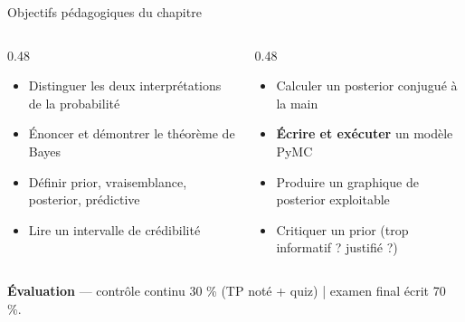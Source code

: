 \begin{frame}{Objectifs pédagogiques du chapitre}
\begin{columns}[t]
\begin{column}{0.48\textwidth}
\begin{kbox}[Savoirs]
\begin{itemize}
  \item Distinguer les deux interprétations de la probabilité
  \item Énoncer et démontrer le théorème de Bayes
  \item Définir prior, vraisemblance, posterior, prédictive
  \item Lire un intervalle de crédibilité
\end{itemize}
\end{kbox}
\end{column}
\begin{column}{0.48\textwidth}
\begin{abox}
\begin{itemize}
  \item Calculer un posterior conjugué à la main
  \item \textbf{Écrire et exécuter} un modèle PyMC
  \item Produire un graphique de posterior exploitable
  \item Critiquer un prior (trop informatif ? justifié ?)
\end{itemize}
\end{abox}
\end{column}
\end{columns}
\vspace{2mm}
\begin{tcolorbox}[colback=byLight,colframe=byGrey!50,arc=2mm,width=.95\textwidth]
\centering\small
\textbf{Évaluation} — contrôle continu 30 \% (TP noté + quiz) \;|\; examen final écrit 70 \%.
\end{tcolorbox}
\end{frame}

